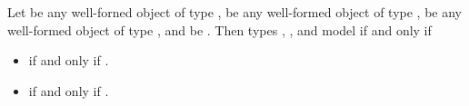 \begin{addedblock}
\begin{itemdescr}
\pnum
Let  be any well-forned object of type ,  be any well-formed object of
type ,  be any well-formed object of type , and  be
. Then types , , and  model  if
and only if

\begin{itemize}
\item {} if and only if .
\item {} if and only if .
\end{itemize}
\end{itemdescr}

\end{addedblock}
